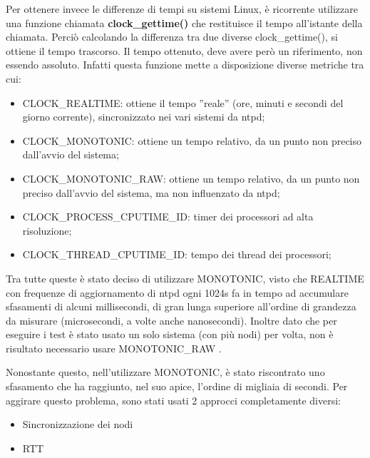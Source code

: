 Per ottenere invece le differenze di tempi su sistemi Linux, è ricorrente utilizzare una funzione chiamata \textbf{clock\_gettime()} che restituisce il tempo all'istante della chiamata. Perciò calcolando la differenza tra due diverse clock\_gettime(), si ottiene il tempo trascorso. Il tempo ottenuto, deve avere però un riferimento, non essendo assoluto. Infatti questa funzione mette a disposizione diverse metriche tra cui:
\begin{itemize}
    \item CLOCK\_REALTIME: ottiene il tempo ''reale'' (ore, minuti e secondi del giorno corrente), sincronizzato nei vari sistemi da ntpd;
    \item CLOCK\_MONOTONIC: ottiene un tempo relativo, da un punto non preciso dall'avvio del sistema;
    \item CLOCK\_MONOTONIC\_RAW: ottiene un tempo relativo, da un punto non preciso dall'avvio del sistema, ma non influenzato da ntpd;
    \item CLOCK\_PROCESS\_CPUTIME\_ID: timer dei processori ad alta risoluzione;
    \item CLOCK\_THREAD\_CPUTIME\_ID: tempo dei thread dei processori;
\end{itemize}
Tra tutte queste è stato deciso di utilizzare MONOTONIC, visto che REALTIME con frequenze di aggiornamento di ntpd ogni 1024s fa in tempo ad accumulare sfasamenti di alcuni millisecondi\cite{ntpd}, di gran lunga superiore all'ordine di grandezza da misurare (microsecondi, a volte anche nanosecondi). Inoltre dato che per eseguire i test è stato usato un solo sistema (con più nodi) per volta, non è risultato necessario usare MONOTONIC\_RAW .

Nonostante questo, nell'utilizzare MONOTONIC, è stato riscontrato uno sfasamento che ha raggiunto, nel suo apice, l'ordine di migliaia di secondi.
Per aggirare questo problema, sono stati usati 2 approcci completamente diversi:
\begin{itemize}
    \item Sincronizzazione dei nodi
    \item RTT
\end{itemize} 
